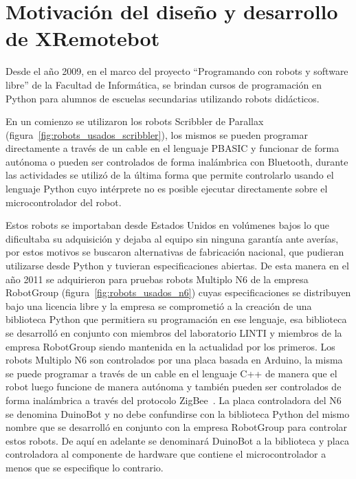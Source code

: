 \chapter{Motivación del diseño y desarrollo de XRemotebot}\label{ch1}

Desde el año 2009, en el marco del proyecto ``Programando con robots y
software libre'' de la Facultad de Informática,
se brindan cursos de programación en Python para alumnos de escuelas
secundarias utilizando robots didácticos.

En un comienzo se utilizaron los robots Scribbler de Parallax
(figura~\ref{fig:robots_usados_scribbler}), los mismos se
pueden programar directamente a través de un cable en el lenguaje
PBASIC y funcionar de forma autónoma o pueden ser controlados de forma
inalámbrica con Bluetooth, durante las actividades se utilizó de la última
forma que permite controlarlo usando el lenguaje Python cuyo intérprete no
es posible ejecutar directamente sobre el microcontrolador del robot.

Estos robots se importaban desde Estados Unidos en volúmenes bajos lo que
dificultaba su adquisición y dejaba al equipo sin ninguna garantía ante
averías, por estos motivos se buscaron alternativas de fabricación nacional,
que pudieran utilizarse desde Python y tuvieran especificaciones abiertas.
De esta manera en el año 2011 se adquirieron para pruebas robots Multiplo N6
de la empresa RobotGroup (figura~\ref{fig:robots_usados_n6})
cuyas especificaciones se distribuyen bajo una licencia libre y
la empresa se comprometió a la creación de una biblioteca Python que permitiera
su programación en ese lenguaje, esa biblioteca se desarrolló en conjunto
con miembros del laboratorio LINTI y miembros de la empresa RobotGroup siendo
mantenida en la actualidad por los primeros. Los robots Multiplo N6 son
controlados por una placa basada en Arduino, la misma se puede programar
a través de un cable en el lenguaje C++ de manera que el robot luego funcione
de manera autónoma y también pueden ser controlados de forma inalámbrica
a través del protocolo ZigBee~\citep{diaz_aprendiendo_2012}. La placa
controladora del N6 se denomina DuinoBot y no debe confundirse con la biblioteca
Python del mismo nombre que se desarrolló en conjunto con la empresa RobotGroup
para controlar estos robots. De aquí en adelante se denominará DuinoBot a la
biblioteca y placa controladora al componente de hardware que contiene el
microcontrolador a menos que se especifique lo contrario.




